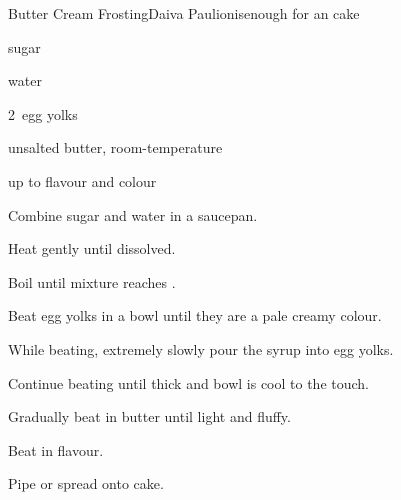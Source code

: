 \begin{recipe}{Butter Cream Frosting}{Daiva Paulionis}{enough for an  cake}

\begin{ingredients}
\item {} sugar
\item {} water
\item 2~egg yolks
\item {} unsalted butter, room-temperature
\item up to  flavour and colour
\end{ingredients}

\begin{directions}
\item Combine sugar and water in a saucepan.
\item Heat gently until dissolved.
\item Boil until mixture reaches .
\item Beat egg yolks in a bowl until they are a pale creamy colour.
\item While beating, extremely slowly pour the syrup into egg yolks.
\item Continue beating until thick and bowl is cool to the touch.
\item Gradually beat in butter until light and fluffy.
\item Beat in flavour.
\item Pipe or spread onto cake.
\end{directions}
\end{recipe}
